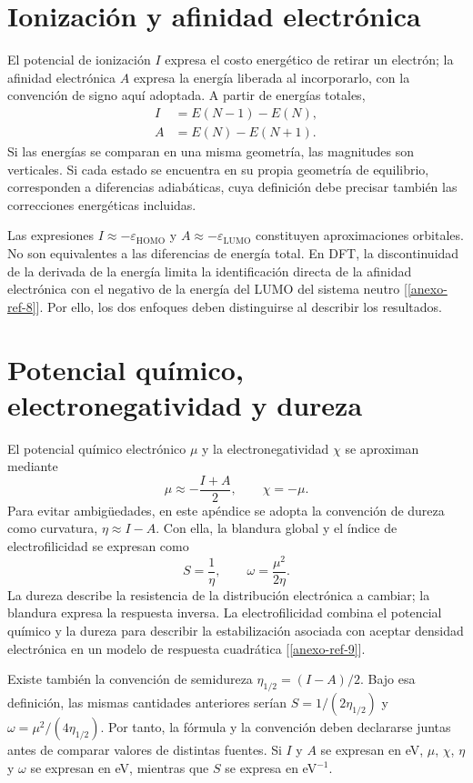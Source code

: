 \documentclass[12 pt, letter, oneside]{book}
\begin{document}
\section{Ionización y afinidad electrónica}
El potencial de ionización $I$ expresa el costo energético de retirar un electrón; la afinidad electrónica $A$ expresa la energía liberada al incorporarlo, con la convención de signo aquí adoptada. A partir de energías totales,
\begin{align}
 I&=E(N-1)-E(N),\\
 A&=E(N)-E(N+1).
\end{align}
Si las energías se comparan en una misma geometría, las magnitudes son verticales. Si cada estado se encuentra en su propia geometría de equilibrio, corresponden a diferencias adiabáticas, cuya definición debe precisar también las correcciones energéticas incluidas.

Las expresiones $I\approx-\varepsilon_{\mathrm{HOMO}}$ y $A\approx-\varepsilon_{\mathrm{LUMO}}$ constituyen aproximaciones orbitales. No son equivalentes a las diferencias de energía total. En DFT, la discontinuidad de la derivada de la energía limita la identificación directa de la afinidad electrónica con el negativo de la energía del LUMO del sistema neutro [\ref{anexo-ref-8}]. Por ello, los dos enfoques deben distinguirse al describir los resultados.

\section{Potencial químico, electronegatividad y dureza}
El potencial químico electrónico $\mu$ y la electronegatividad $\chi$ se aproximan mediante
\begin{equation}
 \mu\approx-\frac{I+A}{2},\qquad \chi=-\mu.
\end{equation}
Para evitar ambigüedades, en este apéndice se adopta la convención de dureza como curvatura, $\eta\approx I-A$. Con ella, la blandura global y el índice de electrofilicidad se expresan como
\begin{equation}
 S=\frac{1}{\eta},\qquad \omega=\frac{\mu^2}{2\eta}.
\end{equation}
La dureza describe la resistencia de la distribución electrónica a cambiar; la blandura expresa la respuesta inversa. La electrofilicidad combina el potencial químico y la dureza para describir la estabilización asociada con aceptar densidad electrónica en un modelo de respuesta cuadrática [\ref{anexo-ref-9}].

Existe también la convención de semidureza $\eta_{1/2}=(I-A)/2$. Bajo esa definición, las mismas cantidades anteriores serían $S=1/(2\eta_{1/2})$ y $\omega=\mu^2/(4\eta_{1/2})$. Por tanto, la fórmula y la convención deben declararse juntas antes de comparar valores de distintas fuentes. Si $I$ y $A$ se expresan en eV, $\mu$, $\chi$, $\eta$ y $\omega$ se expresan en eV, mientras que $S$ se expresa en eV$^{-1}$.
\end{document}
